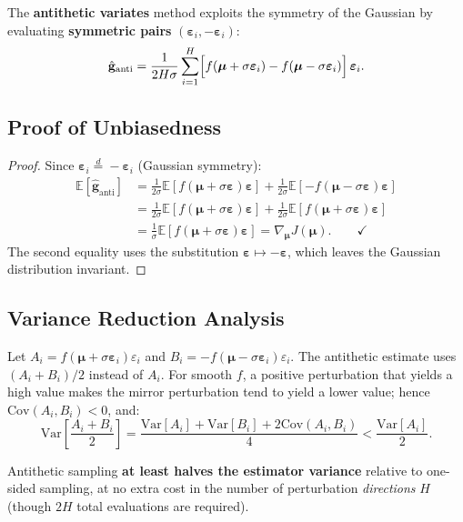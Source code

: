 \documentclass[12pt, a4paper]{article}
\newcommand{\bmu}{\boldsymbol{\mu}}
\newcommand{\beps}{\boldsymbol{\varepsilon}}
\newcommand{\EE}{\mathbb{E}}
\newcommand{\Var}{\mathrm{Var}}
\newcommand{\Cov}{\mathrm{Cov}}
\begin{document}
The \textbf{antithetic variates} method \cite{bratley1987} exploits the
symmetry of the Gaussian by evaluating \textbf{symmetric pairs}
$(\beps_i,-\beps_i)$:
\begin{equation}
  \hat{\mathbf{g}}_{\mathrm{anti}}
  = \frac{1}{2H\sigma}\sum_{i=1}^{H}
    \Bigl[f(\bmu+\sigma\beps_i) - f(\bmu-\sigma\beps_i)\Bigr]\,\beps_i.
  \label{eq:antithetic}
\end{equation}

\subsection{Proof of Unbiasedness}

\begin{proof}
Since $\beps_i \overset{d}{=} -\beps_i$ (Gaussian symmetry):
\begin{align}
  \EE\!\left[\hat{\mathbf{g}}_{\mathrm{anti}}\right]
  &= \frac{1}{2\sigma}
     \EE\!\left[f(\bmu+\sigma\beps)\beps\right]
   + \frac{1}{2\sigma}
     \EE\!\left[-f(\bmu-\sigma\beps)\beps\right]
  \nonumber\\
  &= \frac{1}{2\sigma}
     \EE\!\left[f(\bmu+\sigma\beps)\beps\right]
   + \frac{1}{2\sigma}
     \EE\!\left[f(\bmu+\sigma\beps)\beps\right]
  \nonumber\\
  &= \frac{1}{\sigma}
     \EE\!\left[f(\bmu+\sigma\beps)\beps\right]
   = \nabla_{\bmu} J(\bmu). \qquad\checkmark
\end{align}
The second equality uses the substitution $\beps \mapsto -\beps$,
which leaves the Gaussian distribution invariant.
\end{proof}

\subsection{Variance Reduction Analysis}

Let $A_i = f(\bmu+\sigma\beps_i)\varepsilon_i$ and
$B_i = -f(\bmu-\sigma\beps_i)\varepsilon_i$.
The antithetic estimate uses $(A_i+B_i)/2$ instead of $A_i$.
For smooth $f$, a positive perturbation that yields a high value makes
the mirror perturbation tend to yield a lower value; hence
$\Cov(A_i,B_i)<0$, and:
\begin{equation}
  \Var\!\left[\frac{A_i+B_i}{2}\right]
  = \frac{\Var[A_i]+\Var[B_i]+2\Cov(A_i,B_i)}{4}
  < \frac{\Var[A_i]}{2}.
\end{equation}

\begin{keyresult}
  Antithetic sampling \textbf{at least halves the estimator variance}
  relative to one-sided sampling, at no extra cost in the number of
  perturbation \emph{directions} $H$ (though $2H$ total evaluations
  are required).
\end{keyresult}
\end{document}
